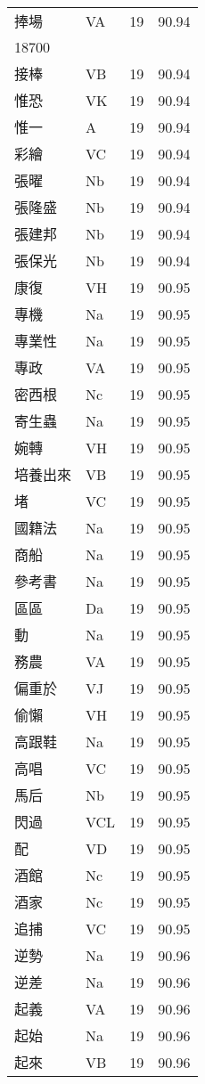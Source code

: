 \documentclass[twocolumn]{book}
\begin{document}
\begin{supertabular}{llrr}
捧場 & VA & 19 &  90.94\\
18700\\
接棒 & VB & 19 &  90.94\\
惟恐 & VK & 19 &  90.94\\
惟一 & A & 19 &  90.94\\
彩繪 & VC & 19 &  90.94\\
張曜 & Nb & 19 &  90.94\\
張隆盛 & Nb & 19 &  90.94\\
張建邦 & Nb & 19 &  90.94\\
張保光 & Nb & 19 &  90.94\\
康復 & VH & 19 &  90.95\\
專機 & Na & 19 &  90.95\\
專業性 & Na & 19 &  90.95\\
專政 & VA & 19 &  90.95\\
密西根 & Nc & 19 &  90.95\\
寄生蟲 & Na & 19 &  90.95\\
婉轉 & VH & 19 &  90.95\\
培養出來 & VB & 19 &  90.95\\
堵 & VC & 19 &  90.95\\
國籍法 & Na & 19 &  90.95\\
商船 & Na & 19 &  90.95\\
參考書 & Na & 19 &  90.95\\
區區 & Da & 19 &  90.95\\
動 & Na & 19 &  90.95\\
務農 & VA & 19 &  90.95\\
偏重於 & VJ & 19 &  90.95\\
偷懶 & VH & 19 &  90.95\\
高跟鞋 & Na & 19 &  90.95\\
高唱 & VC & 19 &  90.95\\
馬后 & Nb & 19 &  90.95\\
閃過 & VCL & 19 &  90.95\\
配 & VD & 19 &  90.95\\
酒館 & Nc & 19 &  90.95\\
酒家 & Nc & 19 &  90.95\\
追捕 & VC & 19 &  90.95\\
逆勢 & Na & 19 &  90.96\\
逆差 & Na & 19 &  90.96\\
起義 & VA & 19 &  90.96\\
起始 & Na & 19 &  90.96\\
起來 & VB & 19 &  90.96\\

\end{supertabular}
\end{document}
